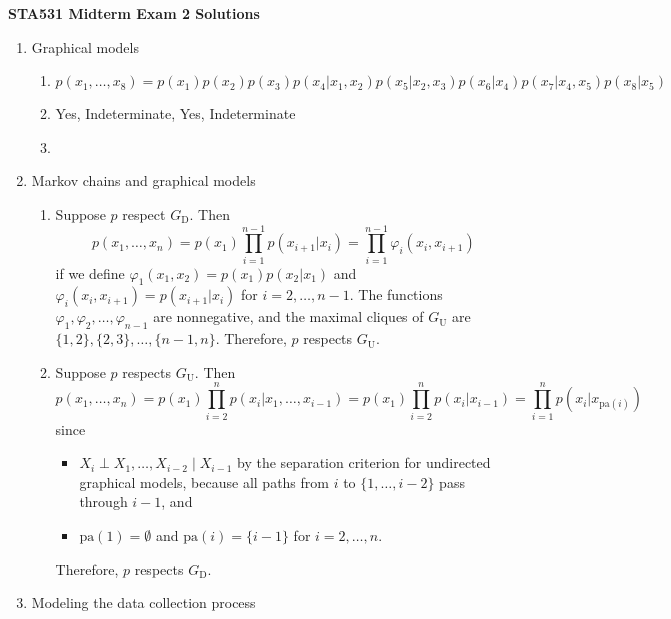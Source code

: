 \documentclass[12pt]{article}
\begin{document}
\begin{center}
\large\textbf{STA531 Midterm Exam 2 Solutions}
\end{center}

\begin{enumerate}
\item Graphical models

\begin{enumerate}
\item $p(x_1,\ldots,x_8) = p(x_1) p(x_2) p(x_3) p(x_4 | x_1,x_2) p(x_5 | x_2,x_3) p(x_6 | x_4) p(x_7 | x_4,x_5) p(x_8 | x_5)$
\item Yes, Indeterminate, Yes, Indeterminate
\item ~\\
\vspace{-4ex}

\end{enumerate}

\item Markov chains and graphical models

\begin{enumerate}
\item Suppose $p$ respect $G_\text{D}$. Then
$$ p(x_1,\ldots,x_n) = p(x_1) \prod_{i = 1}^{n-1} p(x_{i+1} | x_i) = \prod_{i = 1}^{n-1} \varphi_i(x_i,x_{i+1}) $$
if we define $\varphi_1(x_1,x_2) = p(x_1) p(x_2 | x_1)$ and $\varphi_i(x_i,x_{i+1}) = p(x_{i+1} | x_i)$ for $i = 2,\ldots,n-1$. The functions $\varphi_1,\varphi_2,\ldots,\varphi_{n-1}$ are nonnegative, and the maximal cliques of $G_\text{U}$ are $\{1,2 \},\{2,3 \},\ldots,\{n -1,n \}$. Therefore, $p$ respects $G_\text{U}$.
\item Suppose $p$ respects $G_\text{U}$. Then
$$ p(x_1,\ldots,x_n) = p(x_1)\prod_{i = 2}^n p(x_i | x_1,\ldots,x_{i -1}) = p(x_1) \prod_{i = 2}^n p(x_i | x_{i-1}) = \prod_{i = 1}^n p(x_i | x_{\mathrm{pa}(i)})
$$
since
\begin{itemize}
\item $X_i \perp X_1,\ldots,X_{i -2} \mid X_{i -1}$ by the separation criterion for undirected graphical models, because all paths from $i$ to $\{1,\ldots,i -2 \}$ pass through $i -1$, and
\item $\mathrm{pa}(1) = \emptyset$ and $\mathrm{pa}(i) = \{i -1 \}$ for $i = 2,\ldots,n$.
\end{itemize}
Therefore, $p$ respects $G_\text{D}$.
\end{enumerate}

\item Modeling the data collection process


\end{enumerate}
\end{document}
